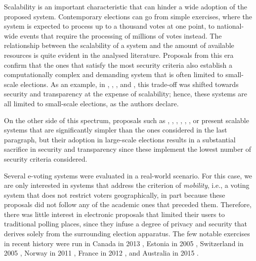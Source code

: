 \documentclass[../main.tex]{subfiles}
\begin{document}
    \par
    Scalability is an important characteristic that can hinder a wide adoption of the proposed system. Contemporary elections can go from simple exercises, where the system is expected to process up to a thousand votes at one point, to national-wide events that require the processing of millions of votes instead. The relationship between the scalability of a system and the amount of available resources is quite evident in the analysed literature. Proposals from this era confirm that the ones that satisfy the most security criteria also establish a computationally complex and demanding system that is often limited to small-scale elections. As an example, in \cite{Cranor2002}, \cite{Nurmi1991}, \cite{Iversen1992}, and \cite{Niemi1999}, this trade-off was shifted towards security and transparency at the expense of scalability; hence, these systems are all limited to small-scale elections, as the authors declare.
    \par
    On the other side of this spectrum, proposals such as \cite{Benaloh1994}, \cite{Benaloh1986a}, \cite{Park1994}, \cite{Juang2002}, \cite{Okamoto1996}, \cite{Okamoto1998}, \cite{Magkos2001} or \cite{Moran2006} present scalable systems that are significantly simpler than the ones considered in the last paragraph, but their adoption in large-scale elections results in a substantial sacrifice in security and transparency since these implement the lowest number of security criteria considered.
    \par
    Several e-voting systems were evaluated in a real-world scenario. For this case, we are only interested in systems that address the criterion of \textit{mobility}, i.e., a voting system that does not restrict voters geographically, in part because these proposals did not follow any of the academic ones that preceded them. Therefore, there was little interest in electronic proposals that limited their users to traditional polling places, since they infuse a degree of privacy and security that derives solely from the surrounding election apparatus. The few notable exercises in recent history were run in Canada in 2013 \cite{Goodman2014}, Estonia in 2005 \cite{Heiberg2005}, Switzerland in 2005 \cite{Binder2019}, Norway in 2011 \cite{Barrat2012}, France in 2012 \cite{Pinault2012}, and Australia in 2015 \cite{Halderman2015}.
    \par
\end{document}
